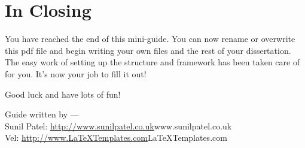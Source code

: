 
\section{In Closing}

You have reached the end of this mini-guide. You can now rename or overwrite this pdf file and begin writing your own  files and the rest of your dissertation. The easy work of setting up the structure and framework has been taken care of for you. It's now your job to fill it out!

Good luck and have lots of fun!

\begin{flushright}
Guide written by ---\\
Sunil Patel: \url{http://www.sunilpatel.co.uk}{www.sunilpatel.co.uk}\\
Vel: \url{http://www.LaTeXTemplates.com}{LaTeXTemplates.com}
\end{flushright}
